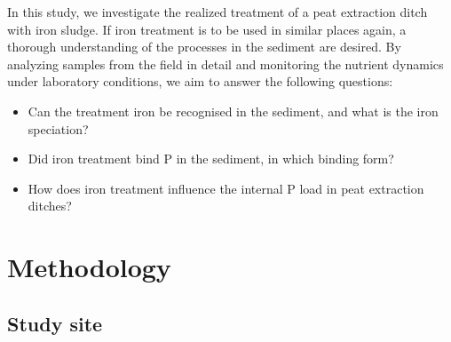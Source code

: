 \documentclass[a4paper,11pt]{article}
\begin{document}
In this study, we investigate the realized treatment of a peat extraction ditch with iron sludge. If iron treatment is to be used in similar places again, a thorough understanding of the processes in the sediment are desired. By analyzing samples from the field in detail and monitoring the nutrient dynamics under laboratory conditions, we aim to answer the following questions:
\begin{itemize}
\item
  Can the treatment iron be recognised in the sediment, and what is the iron speciation?
\item
  Did iron treatment bind P in the sediment, in which binding form?
\item
  How does iron treatment influence the internal P load in peat extraction ditches?
\end{itemize}
\hypertarget{methodology}{%
\section{Methodology}\label{methodology}}

\hypertarget{study-site}{%
\subsection{Study site}\label{study-site}}
\end{document}
